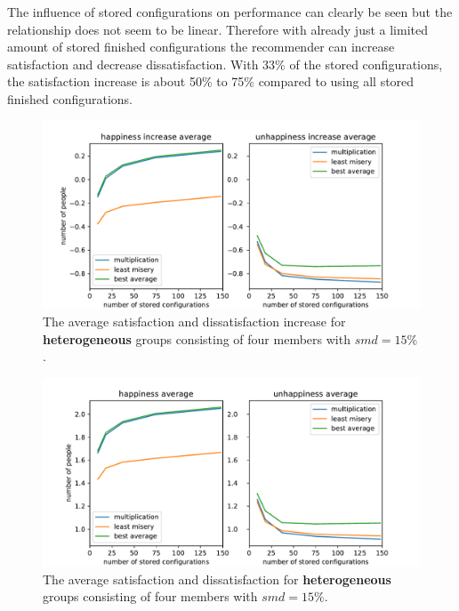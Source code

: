 The influence of stored configurations on performance can clearly be seen but the relationship does not seem to be linear. Therefore with already just a limited amount of stored finished configurations the recommender can increase satisfaction and decrease dissatisfaction. With 33\% of the stored configurations, the satisfaction increase is about 50\% to 75\% compared to using all stored finished configurations.



\begin{figure}
    \centering
    \includegraphics[width=1\textwidth]{./figures/60_evaluation/heterogeneous_happy_unhappy_increase_amount-1000_smd-15.pdf}
    \caption{The average satisfaction and dissatisfaction increase for \textbf{heterogeneous} groups consisting of four members with $smd=15\%$.}
    \label{fig:Evaluation:HeterogenousGroupIncrease}
\end{figure}

\begin{figure}
    \centering
    \includegraphics[width=1\textwidth]{./figures/60_evaluation/heterogeneous_happy_unhappy_total_group_amount-1000_smd-15.pdf}
    \caption{The average satisfaction and dissatisfaction for \textbf{heterogeneous} groups consisting of four members with $smd=15\%$.}
    \label{fig:Evaluation:HeterogenousGroupTotal}
\end{figure}

